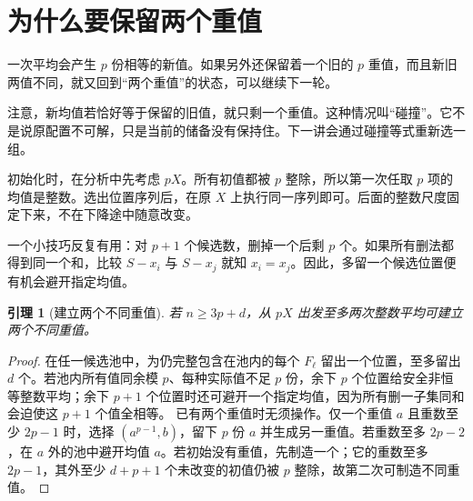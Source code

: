 \documentclass[11pt,a4paper,oneside,openany]{book}
\newtheorem{lemma}[theorem]{引理}
\theoremstyle{definition}
\numberwithin{equation}{chapter}
\begin{document}
\section{为什么要保留两个重值}
一次平均会产生 $p$ 份相等的新值。如果另外还保留着一个旧的 $p$ 重值，而且新旧两值不同，就又回到“两个重值”的状态，可以继续下一轮。

注意，新均值若恰好等于保留的旧值，就只剩一个重值。这种情况叫“碰撞”。它不是说原配置不可解，只是当前的储备没有保持住。下一讲会通过碰撞等式重新选一组。

初始化时，在分析中先考虑 $pX$。所有初值都被 $p$ 整除，所以第一次任取 $p$ 项的均值是整数。选出位置序列后，在原 $X$ 上执行同一序列即可。后面的整数尺度固定下来，不在下降途中随意改变。

一个小技巧反复有用：对 $p+1$ 个候选数，删掉一个后剩 $p$ 个。如果所有删法都得到同一个和，比较 $S-x_i$ 与 $S-x_j$ 就知 $x_i=x_j$。因此，多留一个候选位置便有机会避开指定均值。
\begin{lemma}[建立两个不同重值]\label{lem:initialize}
若 $n\ge3p+d$，从 $pX$ 出发至多两次整数平均可建立两个不同重值。
\end{lemma}
\begin{proof}
在任一候选池中，为仍完整包含在池内的每个 $F_\ell$ 留出一个位置，至多留出 $d$ 个。若池内所有值同余模 $p$、每种实际值不足 $p$ 份，余下 $p$ 个位置给安全非恒等整数平均；余下 $p+1$ 个位置时还可避开一个指定均值，因为所有删一子集同和会迫使这 $p+1$ 个值全相等。
已有两个重值时无须操作。仅一个重值 $a$ 且重数至少 $2p-1$ 时，选择 $(a^{p-1},b)$，留下 $p$ 份 $a$ 并生成另一重值。若重数至多 $2p-2$，在 $a$ 外的池中避开均值 $a$。若初始没有重值，先制造一个；它的重数至多 $2p-1$，其外至少 $d+p+1$ 个未改变的初值仍被 $p$ 整除，故第二次可制造不同重值。
\end{proof}
\end{document}
